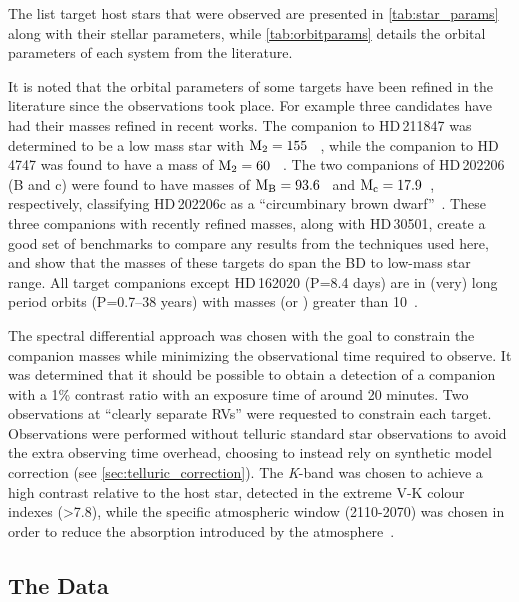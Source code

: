 The list target host stars that were observed are presented in \cref{tab:star_params} along with their stellar parameters, while \cref{tab:orbitparams} details the orbital parameters of each system from the literature.

It is noted that the orbital parameters of some targets have been refined in the literature since the observations took place.
For example three candidates have had their masses refined in recent works.
The companion to {HD\,211847} was determined to be a low mass star with \(\rm M_2=155~\)\Mjup{}~\citep{moutou_eccentricity_2017}, while the companion to {HD\,4747} was found to have a mass of \(\rm M_2=60~\)\Mjup{}~\citep{crepp_trends_2016}.
The two companions of {HD\,202206} (B and c) were found to have masses of \(\rm M_B =93.6\)~\Mjup{} and \(\rm M_c = 17.9\)~\Mjup{}, respectively, classifying {HD\,202206}c as a ``circumbinary brown dwarf''~\citep{benedict_hd_2017}.
These three companions with recently refined masses, along with {HD\,30501}, create a good set of benchmarks to compare any results from the techniques used here, and show that the masses of these targets do span the {BD} to low-mass star range.
All target companions except {HD\,162020} (P=8.4 days) are in (very) long period orbits (P=0.7--38 years) with masses (or \Mtwosini{}) greater than 10~\Mjup{}.

\begin{landscape}
    
    
\end{landscape}


The spectral differential approach was chosen with the goal to constrain the companion masses while minimizing the observational time required to observe.
It was determined that it should be possible to obtain a detection of a companion with a 1\% contrast ratio with an exposure time of around 20 minutes.
Two observations at ``clearly separate {RV}s'' were requested to constrain each target.
Observations were performed without telluric standard star observations to avoid the extra observing time overhead, choosing to instead rely on synthetic model correction (see \cref{sec:telluric_correction}).
The \textit{K}-band was chosen to achieve a high contrast relative to the host star, detected in the extreme V-K colour indexes (>7.8), while the specific atmospheric window (2110-2070\nm{}) was chosen in order to reduce the absorption introduced by the atmosphere~\citep{barnes_hd_2008}.


\subsection{The Data}

